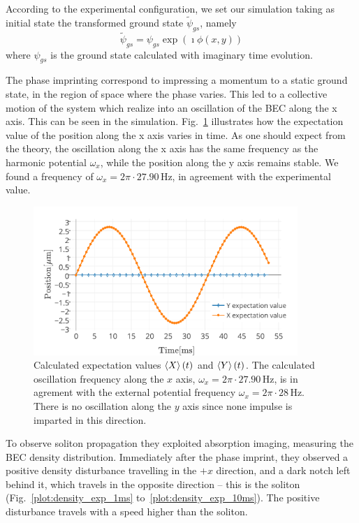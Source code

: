 According to the experimental configuration, we set our simulation taking as initial state the transformed ground state $\tilde{\psi}_{gs}$, namely
\begin{equation}
\tilde{\psi}_{gs} = \psi_{gs} \exp(\imath \phi(x,y))
\end{equation}
where $\psi_{gs}$ is the ground state calculated with imaginary time evolution.

The phase imprinting correspond to impressing a momentum to a static ground state, in the region of space where the phase varies. This led to a collective motion of the system which realize into an oscillation of the BEC along the x axis. This can be seen in the simulation. Fig.~\ref{plot:oscillation} illustrates how the expectation value of the position along the x axis varies in time. As one should expect from the theory, the oscillation along the x axis has the same frequency as the harmonic potential $\omega_x$, while the position along the y axis remains stable. We found a frequency of $\omega_x = 2 \pi \cdot 27.90 \, \mathrm{Hz}$, in agreement with the experimental value.
\begin{figure}[t]
    \centering
	\includegraphics[width=10cm]{Plots/oscillation.pdf}
	\caption{Calculated expectation values $\braket{X}(t)$ and $\braket{Y}(t)$. The calculated oscillation frequency along the $x$ axis, $\omega_x = 2 \pi \cdot 27.90 \, \mathrm{Hz}$, is in agrement with the external potential frequency $\omega_x = 2 \pi \cdot 28 \, \mathrm{Hz}$. There is no oscillation along the $y$ axis since none impulse is imparted in this direction.} \label{plot:oscillation}
\end{figure}

To observe soliton propagation they exploited absorption imaging, measuring the BEC density distribution. Immediately after the phase imprint, they observed a positive  density disturbance travelling in the $+x$ direction, and a dark notch left behind it, which travels in the opposite direction -- this is the soliton (Fig.~\ref{plot:density_exp_1ms} to~\ref{plot:density_exp_10ms}). The positive disturbance travels with a speed higher than the soliton.

